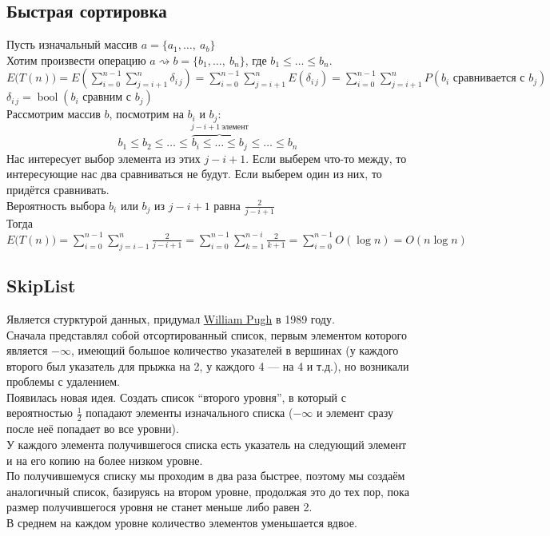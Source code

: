 \documentclass[12pt, a4paper]{article}
\begin{document}
    \subsection*{Быстрая сортировка}
    Пусть изначальный массив $a = \{a_1,\dots,\ a_b\}$\\
    Хотим произвести операцию $a\rightsquigarrow b = \{b_1,\dots,\ b_n\}$, где $b_1\leq\dots\leq b_n$.\\
    $E\big(T(n)\big) = \displaystyle E\left( \sum_{i = 0}^{n - 1}\sum_{j = i + 1}^{n} \delta_{i\, j} \right) = \sum_{i = 0}^{n - 1}\sum_{j = i + 1}^{n} E(\delta_{i\, j}) = \sum_{i = 0}^{n - 1}\sum_{j = i + 1}^{n} P(b_i \text{ сравнивается с } b_j)$\\
    $\delta_{i\, j} = \operatorname{bool}(b_i \text{ сравним с } b_j)$\\
    Рассмотрим массив $b$, посмотрим на $b_i$ и $b_j$:\\
    \[b_1\leq b_2\leq\dots \leq \overset{j - i + 1\ \text{элемент}}{\overbrace{b_i \leq \dots \leq b_j}}\leq \dots \leq b_n\]
    Нас интересует выбор элемента из этих $j - i + 1$. Если выберем что-то между, то интересующие нас два сравниваться не будут. Если выберем один из них, то придётся сравнивать.\\
    Вероятность выбора $b_i$ или $b_j$ из $j - i + 1$ равна $\frac{2}{j - i + 1}$\\
    Тогда $E\big( T(n) \big) = \displaystyle \sum_{i = 0}^{n - 1}\sum_{j = i - 1}^{n} \frac{2}{j - i + 1} = \sum_{i = 0}^{n - 1}\sum_{k = 1}^{n - i} \frac{2}{k + 1} = \sum_{i = 0}^{n - 1}O(\log n) = O(n\log n)$
    \subsection*{SkipList}
    Является стурктурой данных, придумал \href{https://en.wikipedia.org/wiki/William_Pugh_(computer_scientist)}{William Pugh} в 1989 году.\\
    Сначала представлял собой отсортированный список, первым элементом которого является $-\infty$, имеющий большое количество указателей в вершинах (у каждого второго был указатель для прыжка на 2, у каждого 4 --- на 4 и т.д.), но возникали проблемы с удалением.\\
    Появилась новая идея. Создать список ``второго уровня'', в который с вероятностью $\frac{1}{2}$ попадают элементы изначального списка ($-\infty$ и элемент сразу после неё попадает во все уровни).\\
    У каждого элемента получившегося списка есть указатель на следующий элемент и на его копию на более низком уровне.\\
    По получившемуся списку мы проходим в два раза быстрее, поэтому мы создаём аналогичный список, базируясь на втором уровне, продолжая это до тех пор, пока размер получившегося уровня не станет меньше либо равен 2.\\
    В среднем на каждом уровне количество элементов уменьшается вдвое.
\end{document}
